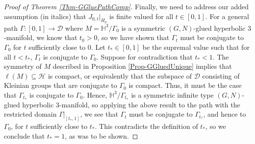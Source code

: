\documentclass[11pt,leqno]{article}
\theoremstyle{introdef}
\numberwithin{lemma}{section}
\theoremstyle{definition}
\begin{document}
\begin{proof}[Proof of Theorem \ref{Thm-GGluePathComp}]
     Finally, we need to address our added assumption (in italics) that $J_{0,t}|_{H_0}$ is finite valued for all $t\in[0,1]$. For a general path $\Gamma:[0,1]\rightarrow\mathcal{D}$ where $M=\mathbb{H}^3/\Gamma_0$ is a symmetric $(G,N)$-glued hyperbolic $3$-manifold, we know that $t_0>0$, so we have shown that $\Gamma_t$ must be conjugate to $\Gamma_0$ for $t$ sufficiently close to $0$. Let $t_*\in[0,1]$ be the supremal value such that for all $t<t_*$, $\Gamma_t$ is conjugate to $\Gamma_0$. Suppose for contradiction that $t_*<1$. The symmetry of $M$ described in Proposition \ref{Prop-GGluedUnique} implies that $\ell(M)\subseteq\mathcal{H}$ is compact, or equivalently that the subspace of $\mathcal{D}$ consisting of Kleinian groups that are conjugate to $\Gamma_0$ is compact. Thus, it must be the case that $\Gamma_{t_*}$ is conjugate to $\Gamma_0$. Hence, $\mathbb{H}^3/\Gamma_{t_*}$ is a symmetric infinite type $(G,N)$-glued hyperbolic $3$-manifold, so applying the above result to the path with the restricted domain $\Gamma|_{[t_*,1]}$, we see that $\Gamma_t$ must be conjugate to $\Gamma_{t_*}$, and hence to $\Gamma_0$, for $t$ sufficiently close to $t_*$. This contradicts the definition of $t_*$, so we conclude that $t_*=1$, as was to be shown.
\end{proof}



\printbibliography
\end{document}
